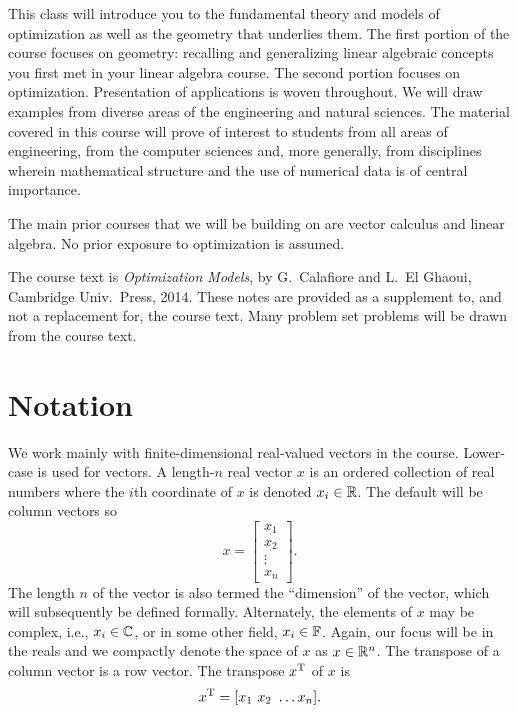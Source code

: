 
This class will introduce you to the fundamental theory and models of
optimization as well as the geometry that underlies them.  The first
portion of the course focuses on geometry: recalling and generalizing
linear algebraic concepts you first met in your linear algebra course.
The second portion focuses on optimization.  Presentation of
applications is woven throughout.  We will draw examples from diverse
areas of the engineering and natural sciences.  The material covered
in this course will prove of interest to students from all areas of
engineering, from the computer sciences and, more generally, from
disciplines wherein mathematical structure and the use of numerical
data is of central importance.

The main prior courses that we will be building on are vector
calculus and linear algebra.  No prior exposure to optimization is assumed.

The course text is {\em Optimization Models}, by G.~Calafiore and
L.~El Ghaoui, Cambridge Univ.~Press, 2014.  These notes are provided
as a supplement to, and not a replacement for, the course text.  Many problem set problems will be drawn from the course text.

\section*{Notation}

We work mainly with finite-dimensional real-valued vectors in the
course.  Lower-case is used for vectors.  A length-$n$ real vector $x$
is an ordered collection of real numbers where the $i$th coordinate of
$x$ is denoted $x_i \in \mathbb{R}$.  The default will be column vectors
so
\begin{equation*}
x = \left[ \begin{array}{c} x_1 \\ x_2 \\ \vdots \\ x_n\end{array} \right].
\end{equation*}
The length $n$ of the vector is also termed the ``dimension'' of the vector, which will subsequently be defined formally.  Alternately, the elements of $x$ may be complex, i.e., $x_i \in \mathbb{C}$, or in some other field, $x_i \in \mathbb{F}$.  Again, our focus will be in the reals and we compactly denote the space of $x$ as $x \in \mathbb{R}^n$.
The transpose of a column vector is a row vector. The transpose $x^{\rm T}$ of $x$ is
\begin{equation*}
x^{\rm T} = [ x_1 \ x_2 \ \ldots x_n].
\end{equation*}

